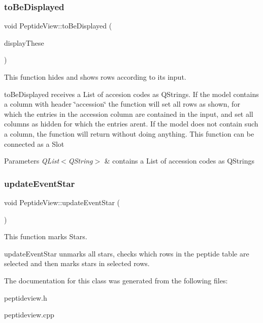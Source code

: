 \subsubsection{\texorpdfstring{to\+Be\+Displayed}{toBeDisplayed}}
{\footnotesize\ttfamily void Peptide\+View\+::to\+Be\+Displayed (\begin{DoxyParamCaption}\item[{Q\+List$<$ Q\+String $>$}]{display\+These }\end{DoxyParamCaption})\hspace{0.3cm}{\ttfamily [slot]}}



This function hides and shows rows according to its input. 

to\+Be\+Displayed receives a List of accesion codes as Q\+Strings. If the model contains a column with header \char`\"{}accession\char`\"{} the function will set all rows as shown, for which the entries in the accession column are contained in the input, and set all columns as hidden for which the entries aren\textquotesingle{}t. If the model does not contain such a column, the function will return without doing anything. This function can be connected as a Slot


\begin{DoxyParams}{Parameters}
{\em Q\+List$<$\+Q\+String$>$} & contains a List of accession codes as Q\+Strings \\
\hline
\end{DoxyParams}
\mbox{\label{class_peptide_view_ab96162d2cb5e04591e6225505afceefe}} 
\subsubsection{\texorpdfstring{update\+Event\+Star}{updateEventStar}}
{\footnotesize\ttfamily void Peptide\+View\+::update\+Event\+Star (\begin{DoxyParamCaption}{ }\end{DoxyParamCaption})\hspace{0.3cm}{\ttfamily [slot]}}



This function marks Stars. 

update\+Event\+Star unmarks all stars, checks which rows in the peptide table are selected and then marks stars in selected rows. 

The documentation for this class was generated from the following files\+:\begin{DoxyCompactItemize}
\item 
peptideview.\+h\item 
peptideview.\+cpp\end{DoxyCompactItemize}

